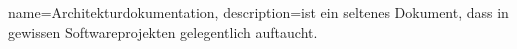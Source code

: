 \printglossaries

{
	name=Architekturdokumentation,
	description={ist ein seltenes Dokument, dass in gewissen Softwareprojekten gelegentlich auftaucht.}
}